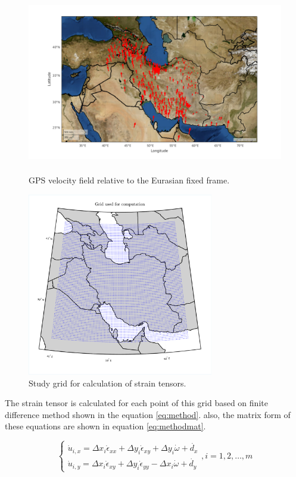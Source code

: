 \documentclass[12pt]{article}
\begin{document}
	\begin{figure}[h!]
		\centering
		\includegraphics[height=8cm]{./Plots/VelocityMap.pdf}
		\caption{GPS velocity field relative to the Eurasian fixed frame.}
		\label{fig:GPSVel}
	\end{figure}
	
	\begin{figure}[h!]
		\centering
		\includegraphics[height=8cm]{./Plots/Grid.pdf}
		\caption{Study grid for calculation of strain tensors.}
		\label{fig:Grid}
	\end{figure}
	
	The strain tensor is calculated for each point of this grid based on finite difference method shown in the equation \ref{eq:method}. also, the matrix form of these equations are shown in equation \ref{eq:methodmat}.
	
	\begin{equation}
		\begin{cases}
			\dot{u}_{i,x} = \Delta x_i \dot{\epsilon}_{xx} + \Delta y_i \dot{\epsilon}_{xy} + \Delta y_i \dot{\omega} + \dot{d_x} \\ 
			\dot{u}_{i,y} = \Delta x_i \dot{\epsilon}_{xy} + \Delta y_i \dot{\epsilon}_{yy} - \Delta x_i \dot{\omega} + \dot{d_y}
		\end{cases}
		, i=1,2,\dots,m
		\label{eq:method}
	\end{equation}
	
\end{document}
